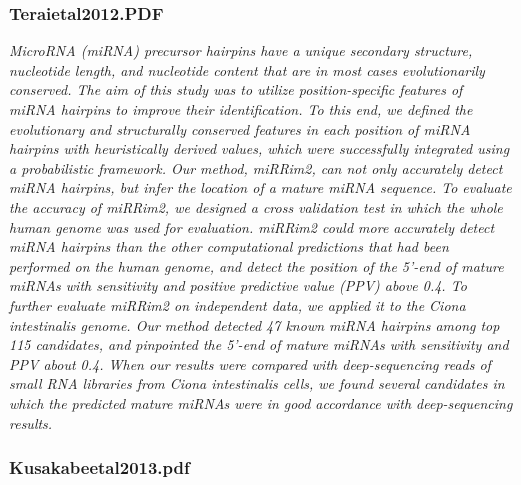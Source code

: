 \subsubsection{Teraietal2012.PDF}
\cite{Terai2012}
\textit{MicroRNA (miRNA) precursor hairpins have a unique secondary structure, nucleotide length, and nucleotide content that are in most cases evolutionarily conserved. The aim of this study was to utilize position-specific features of miRNA hairpins to improve their identification. To this end, we defined the evolutionary and structurally conserved features in each position of miRNA hairpins with heuristically derived values, which were successfully integrated using a probabilistic framework. Our method, miRRim2, can not only accurately detect miRNA hairpins, but infer the location of a mature miRNA sequence. To evaluate the accuracy of miRRim2, we designed a cross validation test in which the whole human genome was used for evaluation. miRRim2 could more accurately detect miRNA hairpins than the other computational predictions that had been performed on the human genome, and detect the position of the 5'-end of mature miRNAs with sensitivity and positive predictive value (PPV) above 0.4. To further evaluate miRRim2 on independent data, we applied it to the Ciona intestinalis genome. Our method detected 47 known miRNA hairpins among top 115 candidates, and pinpointed the 5'-end of mature miRNAs with sensitivity and PPV about 0.4. When our results were compared with deep-sequencing reads of small RNA libraries from Ciona intestinalis cells, we found several candidates in which the predicted mature miRNAs were in good accordance with deep-sequencing results.}


\subsubsection{Kusakabeetal2013.pdf}

